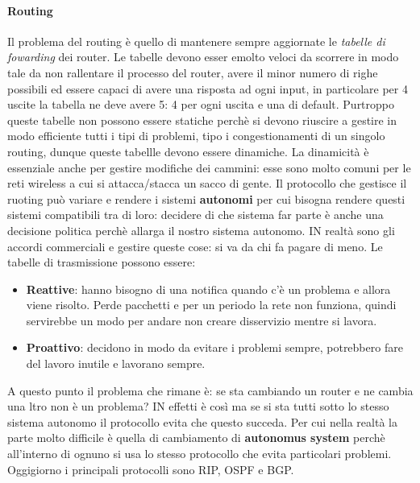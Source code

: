 \documentclass{article}
\begin{document}
\paragraph{Routing}
Il problema del routing è quello di mantenere sempre aggiornate le
\textit{tabelle di fowarding} dei router. Le tabelle devono esser emolto veloci
da scorrere in modo tale da non rallentare il processo del router, avere il
minor numero di righe possibili ed essere capaci di avere una risposta ad ogni
input, in particolare per 4 uscite la tabella ne deve avere 5: 4 per ogni
uscita e una di default. Purtroppo queste tabelle non possono essere statiche
perchè si devono riuscire a gestire in modo efficiente tutti i tipi di
problemi, tipo i congestionamenti di un singolo routing, dunque queste tabellle
devono essere dinamiche. La dinamicità è essenziale anche per gestire modifiche
dei cammini: esse sono molto comuni per le reti wireless a cui si
attacca/stacca un sacco di gente. Il protocollo che gestisce il ruoting può
variare e rendere i sistemi \textbf{autonomi} per cui bisogna rendere questi
sistemi compatibili tra di loro: decidere di che sistema far parte è anche una
decisione politica perchè allarga il nostro sistema autonomo. IN realtà sono
gli accordi commerciali e gestire queste cose: si va da chi fa pagare di meno.
Le tabelle di trasmissione possono essere:

\begin{itemize}
    \item \textbf{Reattive}: hanno bisogno di una notifica quando c'è un problema e allora viene risolto.
          Perde pacchetti e per un periodo la rete non funziona, quindi servirebbe un modo per andare non creare disservizio mentre si lavora.
    \item \textbf{Proattivo}: decidono in modo da evitare i problemi sempre, potrebbero fare del lavoro inutile e lavorano sempre.
\end{itemize}

A questo punto il problema che rimane è: se sta cambiando un router e ne cambia
una ltro non è un problema? IN effetti è così ma se si sta tutti sotto lo
stesso sistema autonomo il protocollo evita che questo succeda. Per cui nella
realtà la parte molto difficile è quella di cambiamento di \textbf{autonomus
    system} perchè all'interno di ognuno si usa lo stesso protocollo che evita
particolari problemi. Oggigiorno i principali protocolli sono RIP, OSPF e BGP.
\end{document}
